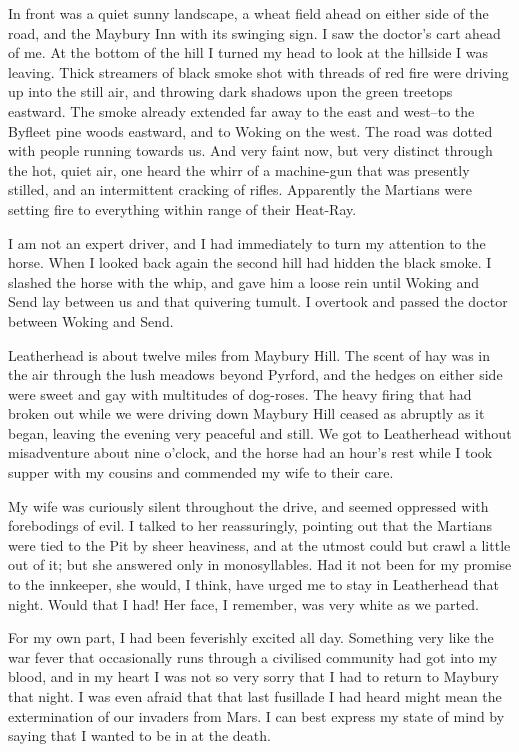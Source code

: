 In front was a quiet sunny landscape, a wheat field ahead on either
side of the road, and the Maybury Inn with its swinging sign. I saw
the doctor's cart ahead of me. At the bottom of the hill I turned
my head to look at the hillside I was leaving. Thick streamers of
black smoke shot with threads of red fire were driving up into the
still air, and throwing dark shadows upon the green treetops
eastward. The smoke already extended far away to the east and
west--to the Byfleet pine woods eastward, and to Woking on the
west. The road was dotted with people running towards us. And very
faint now, but very distinct through the hot, quiet air, one heard
the whirr of a machine-gun that was presently stilled, and an
intermittent cracking of rifles. Apparently the Martians were
setting fire to everything within range of their Heat-Ray.

I am not an expert driver, and I had immediately to turn my
attention to the horse. When I looked back again the second hill
had hidden the black smoke. I slashed the horse with the whip, and
gave him a loose rein until Woking and Send lay between us and that
quivering tumult. I overtook and passed the doctor between Woking
and Send.

Leatherhead is about twelve miles from Maybury Hill. The scent of
hay was in the air through the lush meadows beyond Pyrford, and the
hedges on either side were sweet and gay with multitudes of
dog-roses. The heavy firing that had broken out while we were
driving down Maybury Hill ceased as abruptly as it began, leaving
the evening very peaceful and still. We got to Leatherhead without
misadventure about nine o'clock, and the horse had an hour's rest
while I took supper with my cousins and commended my wife to their
care.

My wife was curiously silent throughout the drive, and seemed
oppressed with forebodings of evil. I talked to her reassuringly,
pointing out that the Martians were tied to the Pit by sheer
heaviness, and at the utmost could but crawl a little out of it;
but she answered only in monosyllables. Had it not been for my
promise to the innkeeper, she would, I think, have urged me to stay
in Leatherhead that night. Would that I had! Her face, I remember,
was very white as we parted.

For my own part, I had been feverishly excited all day. Something
very like the war fever that occasionally runs through a civilised
community had got into my blood, and in my heart I was not so very
sorry that I had to return to Maybury that night. I was even afraid
that that last fusillade I had heard might mean the extermination
of our invaders from Mars. I can best express my state of mind by
saying that I wanted to be in at the death.

